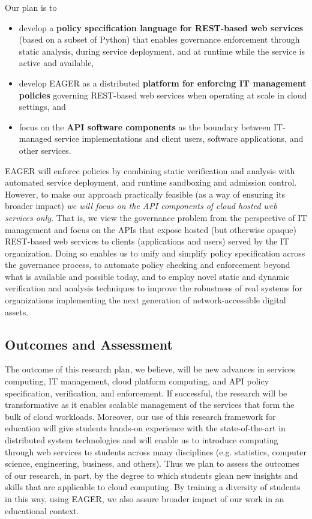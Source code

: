 \documentclass[10pt]{article}
\begin{document}
Our plan is to
\begin{itemize}
\item develop a {\bf policy specification language for REST-based web
services} (based on a subset of Python) that
enables governance enforcement through static analysis, during service
deployment, and at runtime while the service is active and available,
\item develop EAGER as a distributed {\bf platform for enforcing IT 
management policies} governing
REST-based web services when operating at scale in cloud settings, and
\item focus on the {\bf API software components} as the boundary between 
IT-managed
service implementations and client users, software applications, and other
services.
\end{itemize}

EAGER will enforce policies by combining
static verification and analysis with automated
service deployment, and runtime
sandboxing and admission control.  However, to make our approach practically
feasible (as a way of ensuring its broader impact) {\em we will focus on
the API components of cloud hosted web services only}.  That is, we view the
governance problem from the perspective of IT management and focus on the APIs
that expose hosted (but otherwise opaque) REST-based web services to clients
(applications and users) served by the IT organization.
Doing so enables us to unify and simplify policy specification across the 
governance process, to automate policy checking and enforcement beyond what 
is available
and possible today, and to employ novel static and dynamic verification and
analysis techniques to improve the robustness of real systems for
organizations implementing the next generation of network-accessible digital
assets.


\subsection{Outcomes and Assessment}

The outcome of this research plan,
we believe, will be new advances in services computing, IT management, cloud
platform computing, and API policy specification,  verification, and  enforcement.
If successful, the research will be transformative as it
enables scalable management of the services that form the
bulk of cloud workloads.
Moreover, our use of this research framework for
education will give students hands-on experience with the
state-of-the-art in distributed system technologies and will enable us to
introduce computing through web services to students across many disciplines
(e.g. statistics, computer science, engineering, business, and others).
Thus we plan to assess the outcomes of our research, in part, by the degree
to which students glean new insights and skills that are applicable to cloud
computing.  By training a diversity of  students in this way, using EAGER, we 
also assure broader impact of our work in an educational context.
\end{document}

